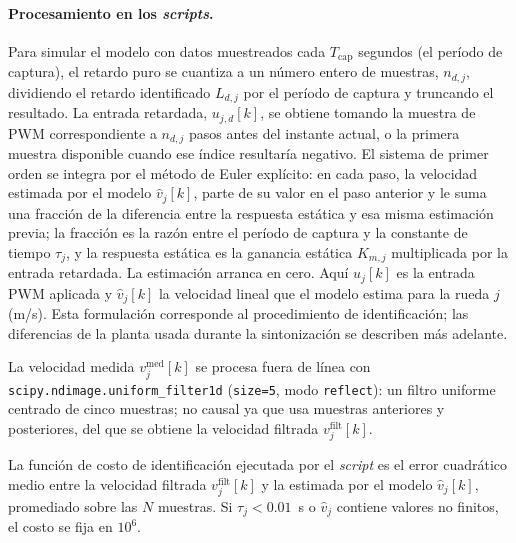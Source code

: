 \begin{appendices}
\paragraph{Procesamiento en los \textit{scripts}.} Para simular el modelo con datos muestreados cada $T_{\mathrm{cap}}$ segundos (el período de captura), el retardo puro se cuantiza a un número entero de muestras, $n_{d,j}$, dividiendo el retardo identificado $L_{d,j}$ por el período de captura y truncando el resultado. La entrada retardada, $u_{j,d}[k]$, se obtiene tomando la muestra de PWM correspondiente a $n_{d,j}$ pasos antes del instante actual, o la primera muestra disponible cuando ese índice resultaría negativo. El sistema de primer orden se integra por el método de Euler explícito: en cada paso, la velocidad estimada por el modelo  $\widehat{v}_j[k]$, parte de su valor en el paso anterior y le suma una fracción de la diferencia entre la respuesta estática y esa misma estimación previa; la fracción es la razón entre el período de captura y la constante de tiempo $\tau_j$, y la respuesta estática es la ganancia estática $K_{m,j}$ multiplicada por la entrada retardada. La estimación arranca en cero. Aquí $u_j[k]$ es la entrada \gls{PWM} aplicada y $\widehat{v}_j[k]$ la velocidad lineal que el modelo estima para la rueda $j$ (m/s). Esta formulación corresponde al procedimiento de identificación; las diferencias de la planta usada durante la sintonización se describen más adelante.

La velocidad medida $v_j^{\mathrm{med}}[k]$ se procesa fuera de línea con \texttt{scipy.ndimage.uniform\_filter1d} (\texttt{size=5}, modo \texttt{reflect}): un filtro uniforme centrado de cinco muestras; no causal ya que usa muestras anteriores y posteriores, del que se obtiene la velocidad filtrada $v_j^{\mathrm{filt}}[k]$.

La función de costo de identificación ejecutada por el \textit{script} es el error cuadrático medio entre la velocidad filtrada $v_j^{\mathrm{filt}}[k]$ y la estimada por el modelo $\widehat{v}_j[k]$, promediado sobre las $N$ muestras. Si $\tau_j<0.01$~s o $\widehat{v}_j$ contiene valores no finitos, el costo se fija en $10^{6}$.


\end{appendices}
